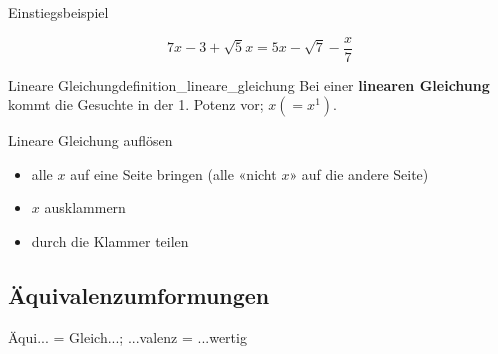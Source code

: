 \begin{beispiel}{Einstiegsbeispiel}{}

$$7x - 3 + \sqrt{5}x=5x - \sqrt{7} - \frac{x}7$$
  
\end{beispiel}

\begin{definition}{Lineare Gleichung}{definition_lineare_gleichung}
  Bei einer \textbf{linearen Gleichung} kommt die Gesuchte in der
  1. Potenz vor; \zB $x (= x^1)$.
\end{definition}

\begin{rezept}{Lineare Gleichung auflösen}{}
  \begin{itemize}
  \item alle $x$ auf eine Seite bringen (alle «nicht $x$» auf die andere Seite)
  \item $x$ ausklammern
  \item durch die Klammer teilen
    \end{itemize} 
  \end{rezept}
\newpage

\subsection{Äquivalenzumformungen}
Äqui... = Gleich...; ...valenz = ...wertig

